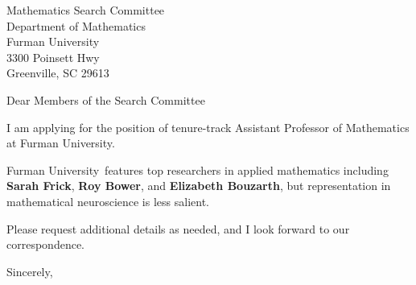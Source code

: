 




	
	
	\def\School{Furman University}
	
	\begin{letter}
		{Mathematics Search Committee\\
			Department of Mathematics\\
			Furman University\\
			3300 Poinsett Hwy\\
			Greenville, SC 29613
		}
		
		\opening{Dear Members of the Search Committee}
		
		
		I am applying for the position of tenure-track Assistant Professor of Mathematics at \School. 
		
		
		
		\School~features top researchers in applied mathematics including \textbf{Sarah Frick}, \textbf{Roy Bower}, and \textbf{Elizabeth Bouzarth}, but representation in mathematical neuroscience is less salient. 
		
		
		
		
		
		Please request additional details as needed, and I look forward to our correspondence.
		
		\closing{Sincerely,}
	\end{letter}
